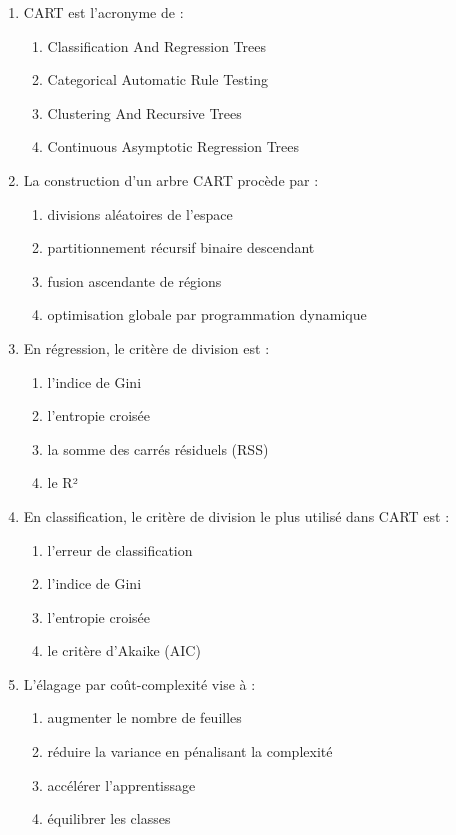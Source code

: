 \documentclass[a4paper,11pt]{article}
\begin{document}
\begin{enumerate}

    \item CART est l'acronyme de :
    \begin{enumerate}
        \item Classification And Regression Trees
        \item Categorical Automatic Rule Testing
        \item Clustering And Recursive Trees
        \item Continuous Asymptotic Regression Trees
    \end{enumerate}

    \item La construction d'un arbre CART procède par :
    \begin{enumerate}
        \item divisions aléatoires de l'espace
        \item partitionnement récursif binaire descendant
        \item fusion ascendante de régions
        \item optimisation globale par programmation dynamique
    \end{enumerate}

    \item En régression, le critère de division est :
    \begin{enumerate}
        \item l'indice de Gini
        \item l'entropie croisée
        \item la somme des carrés résiduels (RSS)
        \item le R²
    \end{enumerate}

    \item En classification, le critère de division le plus utilisé dans CART est :
    \begin{enumerate}
        \item l'erreur de classification
        \item l'indice de Gini
        \item l'entropie croisée
        \item le critère d'Akaike (AIC)
    \end{enumerate}

    \item L'élagage par coût-complexité vise à :
    \begin{enumerate}
        \item augmenter le nombre de feuilles
        \item réduire la variance en pénalisant la complexité
        \item accélérer l'apprentissage
        \item équilibrer les classes
    \end{enumerate}


\end{enumerate}
\end{document}
